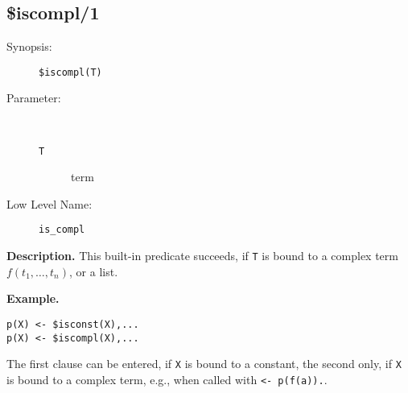 %
%
%
\subsection{\$iscompl/1}

\begin{description}
\item[Synopsis:]
	{\tt \$iscompl(T)}
\item[Parameter:]\ \\[-0.5cm]
	\begin{description}
	\item[{\tt T}] term
	\end{description}
\item[Low Level Name:]
	{\tt is\_compl}
\end{description}

\vspace*{0.5cm}
\noindent
{\bf Description.}
This built-in predicate succeeds, if {\tt T} is
bound to a complex term $f(t_1,\ldots,t_n)$, or a list.

\vspace*{0.5cm}
\noindent
{\bf Example.}
\begin{verbatim}
p(X) <- $isconst(X),...
p(X) <- $iscompl(X),...
\end{verbatim}
The first clause can be entered, if {\tt X} is bound to a constant,
the second only, if {\tt X} is bound to a complex term, e.g., when
called with {\tt <- p(f(a)).}.


